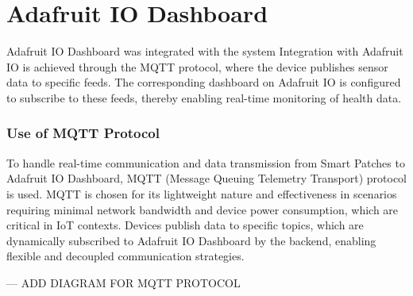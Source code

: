 \chapter{Adafruit IO Dashboard}
\label{app:adafruit}

Adafruit IO Dashboard was integrated with the system 
Integration with Adafruit IO is achieved through the MQTT protocol, where the device publishes sensor data to specific feeds. The corresponding dashboard on Adafruit IO is configured to subscribe to these feeds, thereby enabling real-time monitoring of health data.


\subsection{Use of MQTT Protocol}
To handle real-time communication and data transmission from Smart Patches to Adafruit IO Dashboard, MQTT (Message Queuing Telemetry Transport) protocol is used. MQTT is chosen for its lightweight nature and effectiveness in scenarios requiring minimal network bandwidth and device power consumption, which are critical in IoT contexts. Devices publish data to specific topics, which are dynamically subscribed to Adafruit IO Dashboard by the backend, enabling flexible and decoupled communication strategies.


--- ADD DIAGRAM FOR MQTT PROTOCOL